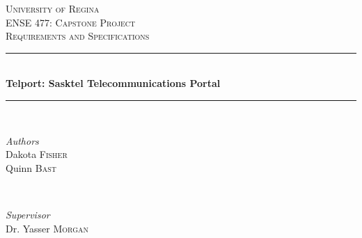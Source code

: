 \documentclass[12pt]{article}
\begin{document}

\begin{titlepage} %
	\newcommand{\HRule}{\rule{\linewidth}{0.5mm}} %
	
	\center %
	
	
	\textsc{\LARGE University of Regina}\\[1.5cm] %
	
	\textsc{\Large ENSE 477: Capstone Project}\\[0.5cm] %
	
	\textsc{\large Requirements and Specifications}\\[0.5cm] %
	
	
	\HRule\\[0.4cm]
	
	{\huge\bfseries Telport: Sasktel Telecommunications Portal}\\[0.4cm] %
	
	\HRule\\[1.5cm]
	
	
	\begin{minipage}[t]{0.4\textwidth}
		\begin{flushleft}
			\large
			\textit{Authors}\\
			Dakota \textsc{Fisher}\\ %
			Quinn \textsc{Bast} %
		\end{flushleft}
	\end{minipage}
	~
	\begin{minipage}[t]{0.4\textwidth}
		\begin{flushright}
			\large
			\textit{Supervisor}\\
			Dr. Yasser \textsc{Morgan} %
		\end{flushright}
	\end{minipage}
	

\end{titlepage}
\end{document}
